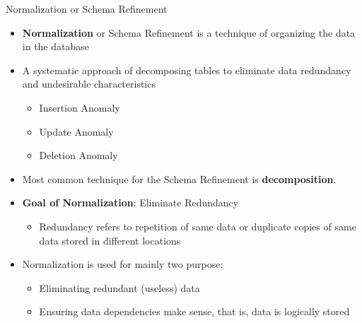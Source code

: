 \documentclass[aspectratio=169, xcolor=dvipsnames]{beamer}
\begin{document}
\begin{frame}{Normalization or Schema Refinement}
    \begin{itemize}[<+->]
        \item \textbf{Normalization} or Schema Refinement is a technique of organizing the data in the database
        \item A systematic approach of decomposing tables to eliminate data redundancy and undesirable characteristics
        \begin{itemize}
            \item[$\triangleright$] Insertion Anomaly
            \item[$\triangleright$] Update Anomaly
            \item[$\triangleright$] Deletion Anomaly
        \end{itemize}
        \item Most common technique for the Schema Refinement is \textbf{decomposition}.
        \item \textbf{Goal of Normalization}: Eliminate Redundancy
        \begin{itemize}
            \item[$\triangleright$] Redundancy refers to repetition of same data or duplicate copies of same data stored in different locations
        \end{itemize}
        \item Normalization is used for mainly two purpose:
        \begin{itemize}
            \item[$\triangleright$] Eliminating redundant (useless) data
            \item[$\triangleright$] Ensuring data dependencies make sense, that is, data is logically stored
        \end{itemize}
    \end{itemize}
\end{frame}
\end{document}
